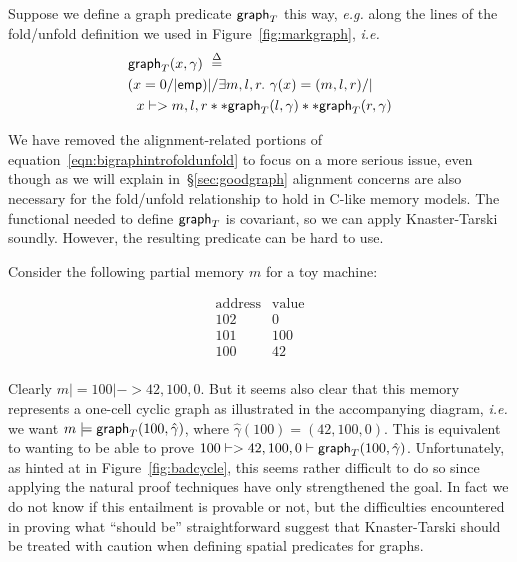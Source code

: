 
Suppose we define a graph predicate $\mathsf{graph}_T$ this way, \emph{e.g.} along the lines of the fold/unfold definition we used in Figure~\ref{fig:markgraph}, \emph{i.e.}
\begin{align*}
\graphkt(x, \gamma) ~ & \stackrel{\Delta}{=}\\
(x = 0 /| \p{emp}) & |/ \exists m,l,r.~ \gamma(x)=(m,l,r) /| \null \\
x |-> m,l,r & ** \graphkt(l, \gamma) ** \graphkt(r, \gamma)
\end{align*}

We have removed the alignment-related portions of equation~\eqref{eqn:bigraphintrofoldunfold} to focus on a more serious issue, even though as we will explain in~\S\ref{sec:goodgraph} alignment concerns are also necessary for the fold/unfold relationship to hold in C-like memory models.  The functional needed to define $\mathsf{graph}_T$ is covariant, so we can apply Knaster-Tarski soundly.  However, the resulting predicate can be hard to use.

Consider the following partial memory $m$ for a toy machine:

\begin{minipage}{.24\textwidth}
\qquad \[
\begin{array}{l|l}
\textrm{address} & \textrm{value} \\
\hline
102 & 0 \\
101 & 100 \\
100 & 42 \\
\end{array}
\]
\end{minipage}
\begin{minipage}{.19\textwidth}
\centering
{}
\endpgfgraphicnamed
\end{minipage}
\vspace{0.75ex}

\noindent Clearly $m |= 100 |-> 42,100,0$.  But it seems also clear that this memory represents a one-cell cyclic graph as illustrated in the accompanying diagram, \emph{i.e.} we want $m |= \mathsf{graph}_T(100,\hat{\gamma})$, where $\hat{\gamma}(100) = (42,100,0)$.  This is equivalent to wanting to be able to prove $100 |-> 42,100,0 |- \mathsf{graph}_T(100,\hat{\gamma})$.  Unfortunately, as hinted at in Figure~\ref{fig:badcycle}, this seems rather difficult to do so since applying the natural proof techniques have only strengthened the goal.  In fact we do not know if this entailment is provable or not, but the difficulties encountered in proving what ``should be'' straightforward suggest that Knaster-Tarski should be treated with caution when defining spatial predicates for graphs.

